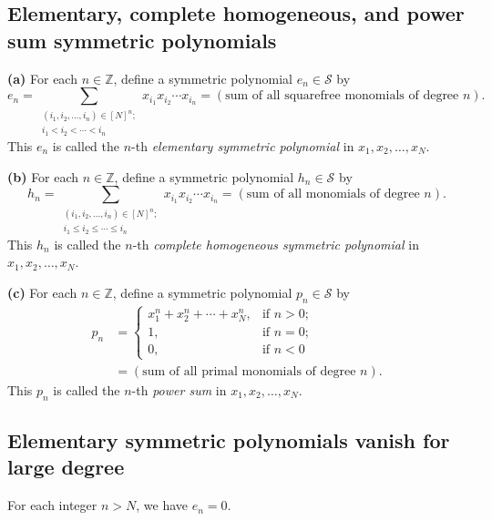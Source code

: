 \subsection{Elementary, complete homogeneous, and power sum symmetric polynomials}

\begin{definition}
\label{def.sf.ehp}
\leantarget
\leanok
\textbf{(a)} For each $n \in \mathbb{Z}$, define a symmetric
polynomial $e_n \in \mathcal{S}$ by
\[
e_n = \sum_{\substack{(i_1, i_2, \ldots, i_n) \in [N]^n; \\ i_1 < i_2 < \cdots < i_n}}
x_{i_1} x_{i_2} \cdots x_{i_n}
= (\text{sum of all squarefree monomials of degree } n).
\]
This $e_n$ is called the $n$-th \emph{elementary symmetric polynomial} in
$x_1, x_2, \ldots, x_N$. \medskip

\textbf{(b)} For each $n \in \mathbb{Z}$, define a symmetric polynomial
$h_n \in \mathcal{S}$ by
\[
h_n = \sum_{\substack{(i_1, i_2, \ldots, i_n) \in [N]^n; \\ i_1 \leq i_2 \leq \cdots \leq i_n}}
x_{i_1} x_{i_2} \cdots x_{i_n}
= (\text{sum of all monomials of degree } n).
\]
This $h_n$ is called the $n$-th \emph{complete homogeneous symmetric polynomial}
in $x_1, x_2, \ldots, x_N$. \medskip

\textbf{(c)} For each $n \in \mathbb{Z}$, define a symmetric polynomial
$p_n \in \mathcal{S}$ by
\begin{align*}
p_n &=
\begin{cases}
x_1^n + x_2^n + \cdots + x_N^n, & \text{if } n > 0; \\
1, & \text{if } n = 0; \\
0, & \text{if } n < 0
\end{cases}
\\
&= (\text{sum of all primal monomials of degree } n).
\end{align*}
This $p_n$ is called the $n$-th \emph{power sum} in $x_1, x_2, \ldots, x_N$.
\end{definition}

\subsection{Elementary symmetric polynomials vanish for large degree}

\begin{proposition}
\label{prop.sf.en=0}
\leantarget
\leanok
For each integer $n > N$, we have $e_n = 0$.
\end{proposition}

